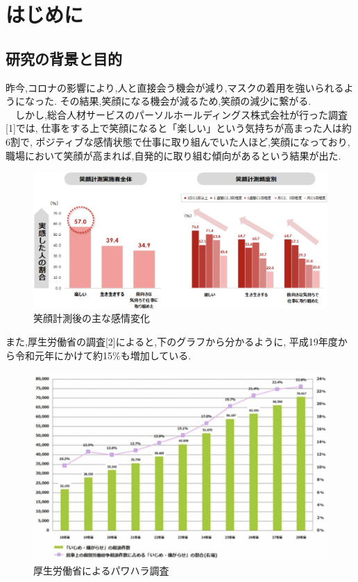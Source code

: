 \chapter{はじめに}
\label {chp:tex_basic}

\section{研究の背景と目的}
\label{sec:tex_basic_section}
昨今,コロナの影響により,人と直接会う機会が減り,マスクの着用を強いられるようになった.
その結果,笑顔になる機会が減るため,笑顔の減少に繋がる. \\
　しかし,総合人材サービスのパーソルホールディングス株式会社が行った調査[1]では,
仕事をする上で笑顔になると「楽しい」という気持ちが高まった人は約6割で,
ポジティブな感情状態で仕事に取り組んでいた人ほど,笑顔になっており,
職場において笑顔が高まれば,自発的に取り組む傾向があるという結果が出た.

\begin{figure}[!h]
    \begin{center}
        \includegraphics[scale=0.5, clip]{./img/work.png}
        \caption{笑顔計測後の主な感情変化}
        \label{fig:図の名前}
    \end{center}
\end{figure}

また,厚生労働省の調査[2]によると,下のグラフから分かるように,
平成19年度から令和元年にかけて約15\%も増加している.

\clearpage

\begin{figure}[!h]
    \begin{center}
        \includegraphics[scale=0.6, clip]{./img/graph.png}
        \caption{厚生労働省によるパワハラ調査}
        \label{fig:図の名前}
    \end{center}
\end{figure}

